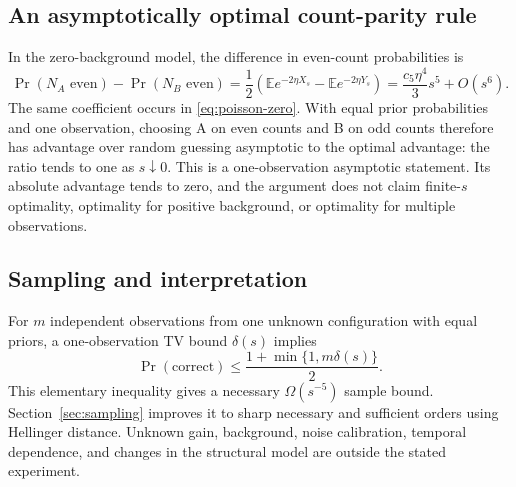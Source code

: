 \subsection{An asymptotically optimal count-parity rule}

In the zero-background model, the difference in even-count probabilities is
\[
 \Pr(N_A\text{ even})-\Pr(N_B\text{ even})
 =\frac12\left(\mathbb E e^{-2\eta X_s}
                   -\mathbb E e^{-2\eta Y_s}\right)
 =\frac{c_5\eta^4}{3}s^5+O(s^6).
\]
The same coefficient occurs in \eqref{eq:poisson-zero}. With equal prior
probabilities and one observation, choosing A on even counts and B on odd
counts therefore has advantage over random guessing asymptotic to the
optimal advantage: the ratio tends to one as $s\downarrow0$.
This is a one-observation asymptotic statement. Its absolute advantage
tends to zero, and the argument does not claim finite-$s$ optimality,
optimality for positive background, or optimality for multiple observations.

\subsection{Sampling and interpretation}

For $m$ independent observations from one unknown configuration with equal
priors, a one-observation TV bound $\delta(s)$ implies
\[
 \Pr(\text{correct})\le\frac{1+\min\{1,m\delta(s)\}}2.
\]
This elementary inequality gives a necessary $\Omega(s^{-5})$ sample bound.
Section~\ref{sec:sampling} improves it to sharp necessary and sufficient
orders using Hellinger distance. Unknown gain, background, noise calibration,
temporal dependence, and changes in the structural model are outside the
stated experiment.

